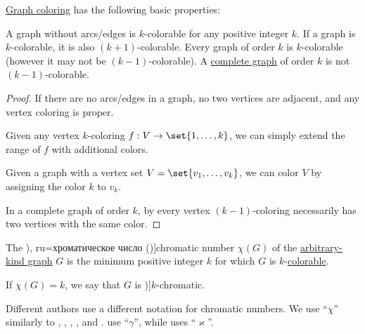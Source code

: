 \begin{proposition}\label{thm:def:graph_coloring}
  \hyperref[def:multipartite_graph]{Graph coloring} has the following basic properties:
  \begin{thmenum}
     A graph without arcs/edges is \( k \)-colorable for any positive integer \( k \).
     If a graph is \( k \)-colorable, it is also \( (k + 1) \)-colorable.
     Every graph of order \( k \) is \( k \)-colorable (however it may not be \( (k - 1) \)-colorable).
     A \hyperref[def:complete_graph]{complete graph} of order \( k \) is not \( (k - 1) \)-colorable.
  \end{thmenum}
\end{proposition}
\begin{proof}
   If there are no arcs/edges in a graph, no two vertices are adjacent, and any vertex coloring is proper.

   Given any vertex \( k \)-coloring \( f: V \to \set{ 1, \ldots, k } \), we can simply extend the range of \( f \) with additional colors.

   Given a graph with a vertex set \( V = \set{ v_1, \ldots, v_k } \), we can color \( V \) by assigning the color \( k \) to \( v_k \).

   In a complete graph of order \( k \), by  every vertex \( (k - 1) \)-coloring necessarily has two vertices with the same color.
\end{proof}

\begin{definition}\label{def:chromatic_number}
  The \term[bg=хроматично число (\cite[142]{Мирчев2001}), ru=хроматическое число (\cite[235]{Емеличев1990})]{chromatic number} \( \chi(G) \) of the \hyperref[rem:arbitrary_kind_graph]{arbitrary-kind graph} \( G \) is the minimum positive integer \( k \) for which \( G \) is \( k \)-\hyperref[def:graph_coloring/colorable]{colorable}.

  If \( \chi(G) = k \), we say that \( G \) is \term[ru=\( k \)-хроматический (граф) (\cite[236]{Емеличев1990})]{\( k \)-chromatic}.
\end{definition}
\begin{comments}
  \item Different authors use a different notation for chromatic numbers. We use \enquote{\( \chi \)} similarly to , , , ,  and .  use \enquote{\( \gamma \)}, while  uses \enquote{\( \varkappa \)}.
\end{comments}
